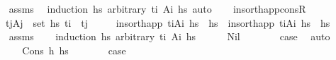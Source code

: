 \begin{isabellebody}
%
\isadelimproof
\ \ \ \ %
\endisadelimproof
%
\isatagproof
{}\isamarkupfalse%
\ assms\ \isamarkupfalse%
\ {\isacharparenleft}{\kern0pt}induction\ hs\ arbitrary{\isacharcolon}{\kern0pt}\ t\isactrlsub i\ A\isactrlsub i\ hs\ auto%
\endisatagproof
{\isafoldproof}%
%
\isadelimproof
\isanewline
%
\endisadelimproof
\isanewline
\ \ \isamarkupfalse%
\ insort{\isacharunderscore}{\kern0pt}happ{\isacharunderscore}{\kern0pt}consR{\isacharcolon}{\kern0pt}\isanewline
\ \ \ \ \ {\isachardoublequoteopen}{\isasymforall}{\isacharparenleft}{\kern0pt}t\isactrlsub j{\isacharcomma}{\kern0pt}A\isactrlsub j{\isacharparenright}{\kern0pt}\ {\isasymin}\ set\ hs\ t\isactrlsub i\ {\isacharless}{\kern0pt}\ t\isactrlsub j{\isachardoublequoteclose}\isanewline
\ \ \ \ \ {\isachardoublequoteopen}{\isacharparenleft}{\kern0pt}insort{\isacharunderscore}{\kern0pt}happ\ {\isacharparenleft}{\kern0pt}t\isactrlsub i{\isacharcomma}{\kern0pt}A\isactrlsub i{\isacharparenright}{\kern0pt}\ hs\ {\isacharat}{\kern0pt}\ hs\ {\isacharequal}{\kern0pt}\ insort{\isacharunderscore}{\kern0pt}happ\ {\isacharparenleft}{\kern0pt}t\isactrlsub i{\isacharcomma}{\kern0pt}A\isactrlsub i{\isacharparenright}{\kern0pt}\ {\isacharparenleft}{\kern0pt}hs\ {\isacharat}{\kern0pt}\ hs\isanewline
%
\isadelimproof
\ \ \ \ %
\endisadelimproof
%
\isatagproof
{}\isamarkupfalse%
\ assms\isanewline
\ \ \isamarkupfalse%
\ {\isacharparenleft}{\kern0pt}induction\ hs\ arbitrary{\isacharcolon}{\kern0pt}\ t\isactrlsub i\ A\isactrlsub i\ hs\isanewline
\ \ \ \ \isamarkupfalse%
\ Nil\isanewline
\ \ \ \ \isamarkupfalse%
\ \isamarkupfalse%
\ {\isacharquery}{\kern0pt}case\ \isamarkupfalse%
\ auto\isanewline
\ \ \isamarkupfalse%
\isanewline
\ \ \ \ \isamarkupfalse%
\ {\isacharparenleft}{\kern0pt}Cons\ h\ hs\isanewline
\ \ \ \ \isamarkupfalse%
\ \isamarkupfalse%
\ {\isacharquery}{\kern0pt}case\ \isamarkupfalse%

\end{isabellebody}
